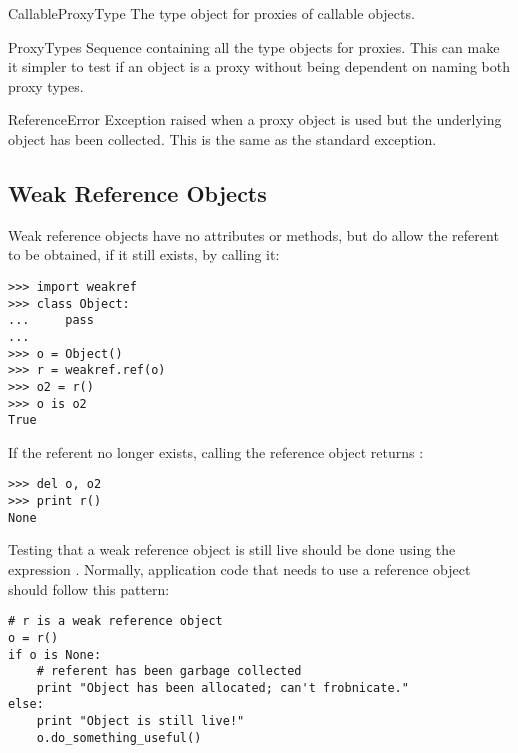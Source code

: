 \begin{datadesc}{CallableProxyType}
  The type object for proxies of callable objects.
\end{datadesc}

\begin{datadesc}{ProxyTypes}
  Sequence containing all the type objects for proxies.  This can make
  it simpler to test if an object is a proxy without being dependent
  on naming both proxy types.
\end{datadesc}

\begin{excdesc}{ReferenceError}
  Exception raised when a proxy object is used but the underlying
  object has been collected.  This is the same as the standard
   exception.
\end{excdesc}


\begin{seealso}
\end{seealso}


\subsection{Weak Reference Objects
            \label{weakref-objects}}

Weak reference objects have no attributes or methods, but do allow the
referent to be obtained, if it still exists, by calling it:

\begin{verbatim}
>>> import weakref
>>> class Object:
...     pass
...
>>> o = Object()
>>> r = weakref.ref(o)
>>> o2 = r()
>>> o is o2
True
\end{verbatim}

If the referent no longer exists, calling the reference object returns
:

\begin{verbatim}
>>> del o, o2
>>> print r()
None
\end{verbatim}

Testing that a weak reference object is still live should be done
using the expression .  Normally,
application code that needs to use a reference object should follow
this pattern:

\begin{verbatim}
# r is a weak reference object
o = r()
if o is None:
    # referent has been garbage collected
    print "Object has been allocated; can't frobnicate."
else:
    print "Object is still live!"
    o.do_something_useful()
\end{verbatim}

